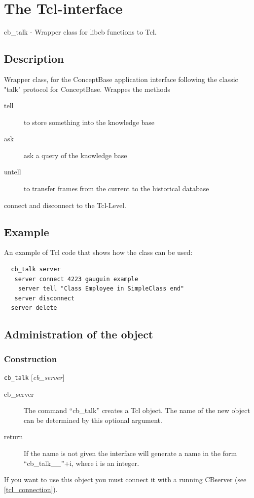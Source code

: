 
\newcommand{\obj}[1]{{\it #1}}		%
\newcommand{\cmd}[1]{{\tt #1}}		%
\newcommand{\para}[1]{$<$#1$>$}		%
\newcommand{\refarg}[1]{{\tt #1}}		%
\newcommand{\refslot}[1]{'{\tt #1}'}	%


\chapter{The Tcl-interface}
cb\_talk - 
Wrapper class for libcb functions to Tcl.

\section{Description}
	Wrapper class, for the ConceptBase application interface following
	the classic "talk" protocol for ConceptBase. Wrappes the methods
 \begin{description}
  \item[tell] to store something into the knowledge base
  \item[ask] ask a query of the knowledge base
  \item[untell] to transfer frames from the current to the historical database
 \end{description}
	connect and disconnect to the Tcl-Level. 
\section{Example}
 \label{tcl_example}
	An example of Tcl code that shows how the class can be used:
 \begin{verbatim}
  cb_talk server
   server connect 4223 gauguin example
    server tell "Class Employee in SimpleClass end"
   server disconnect
  server delete 
 \end{verbatim}
\section{Administration of the object}
 \subsection{Construction} 
  \label{tcl_construction}
	\begin{method}{\cmd{cb\_talk} [\obj{cb\_server}]}
	  \begin{description}
	   \item[ cb\_server]
		The command ``cb\_talk'' creates a Tcl object.
		The name of the new object can be determined by this 
		optional argument. %
	   \item[ return]
		If the name is not given the interface will generate
		a name in the form ``cb\_talk\_\_''+i, 
		where i is an integer. 
	  \end{description}
	If you want to use this object you must connect it with a 
	 running CBserver (see \ref{tcl_connection}).
	\end{method}


